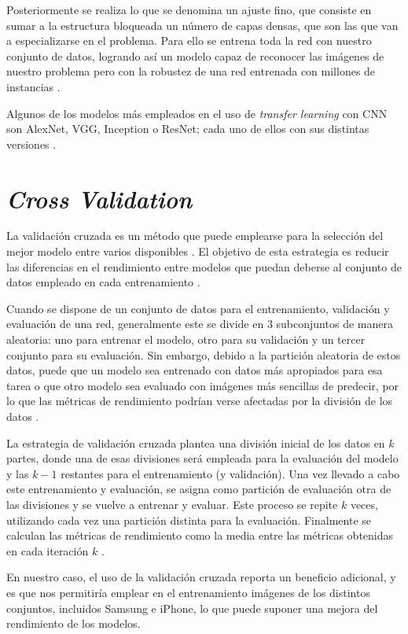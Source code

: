 Posteriormente se realiza lo que se denomina un ajuste fino, que consiste en sumar a la estructura bloqueada un número de capas densas, que son las que van a especializarse en el problema. Para ello se entrena toda la red con nuestro conjunto de datos, logrando así un modelo capaz de reconocer las imágenes de nuestro problema pero con la robustez de una red entrenada con millones de instancias \cite{trans:springer}.

Algunos de los modelos más empleados en el uso de \textit{transfer learning} con CNN son AlexNet, VGG, Inception o ResNet; cada uno de ellos con sus distintas versiones \cite{trans:ieee,trans:scihub}.

\section{\textit{Cross Validation}}

La validación cruzada es un método que puede emplearse para la selección del mejor modelo entre varios disponibles \cite{crossval:scihub}. El objetivo de esta estrategia es reducir las diferencias en el rendimiento entre modelos que puedan deberse al conjunto de datos empleado en cada entrenamiento \cite{crossval:springer}.

Cuando se dispone de un conjunto de datos para el entrenamiento, validación y evaluación de una red, generalmente este se divide en 3 subconjuntos de manera aleatoria: uno para entrenar el modelo, otro para su validación y un tercer conjunto para su evaluación. Sin embargo, debido a la partición aleatoria de estos datos, puede que un modelo sea entrenado con datos más apropiados para esa tarea o que otro modelo sea evaluado con imágenes más sencillas de predecir, por lo que las métricas de rendimiento podrían verse afectadas por la división de los datos \cite{crossval:elsevier}. 

La estrategia de validación cruzada plantea una división inicial de los datos en $k$ partes, donde una de esas divisiones será empleada para la evaluación del modelo y las $k-1$ restantes para el entrenamiento (y validación). Una vez llevado a cabo este entrenamiento y evaluación, se asigna como partición de evaluación otra de las divisiones y se vuelve a entrenar y evaluar. Este proceso se repite $k$ veces, utilizando cada vez una partición distinta para la evaluación. Finalmente se calculan las métricas de rendimiento como la media entre las métricas obtenidas en cada iteración $k$ \cite{crossval:elsevier}.

En nuestro caso, el uso de la validación cruzada reporta un beneficio adicional, y es que nos permitiría emplear en el entrenamiento imágenes de los distintos conjuntos, incluidos Samsung e iPhone, lo que puede suponer una mejora del rendimiento de los modelos.

